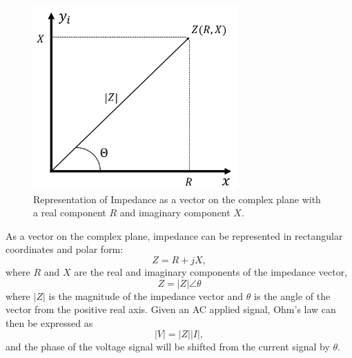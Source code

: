  \begin{figure}[ht]
 \centering
 \includegraphics[width=0.7\textwidth]{images/impdedanceDiagram.png}
 \caption[Representation of impedance as a vector on the complex plane]{Representation of Impedance as a vector on the complex plane with a real component $R$ and imaginary component $X$. }
 \label{fig:Impedance_diagram}
 \end{figure}
 
 \par As a vector on the complex plane, impedance can be represented in rectangular coordinates and polar form:
 \begin{equation}
    Z = R + jX,
 \end{equation}
 \noindent where $R$ and $X$ are the real and imaginary components of the impedance vector, 
 \begin{equation}
     Z = |Z| \angle \theta
     \label{eqn:z_polar}
 \end{equation}
 \noindent where $|Z|$ is the magnitude of the impedance vector and $\theta$ is the angle of the vector from the positive real axis. Given an AC applied signal, Ohm's law can then be expressed as
 \begin{equation}
    |V| = |Z||I|,
    \label{eqn:ohm_mag}
 \end{equation}
 \noindent and the phase of the voltage signal will be shifted from the current signal by $\theta$. 
 
